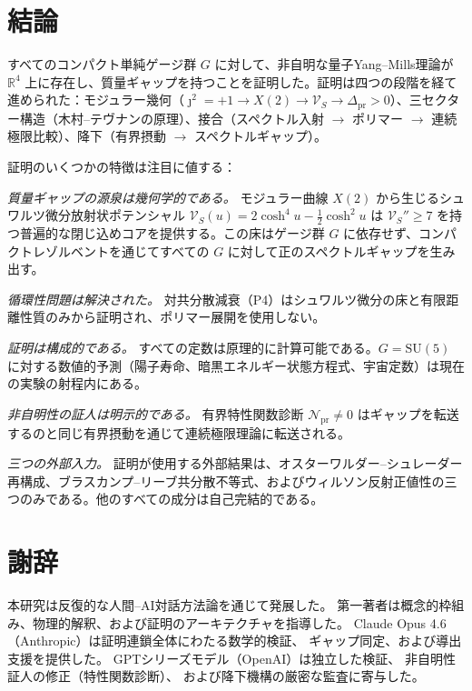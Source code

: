 \documentclass[12pt]{article}
\theoremstyle{plain}
\theoremstyle{definition}
\numberwithin{equation}{section}
\newcommand{\R}{\mathbb{R}}
\newcommand{\pr}{\mathrm{pr}}
\begin{document}
\section*{結論}

すべてのコンパクト単純ゲージ群 $G$ に対して、非自明な量子Yang--Mills理論が $\R^4$ 上に存在し、質量ギャップを持つことを証明した。証明は四つの段階を経て進められた：モジュラー幾何（$\jmath^2=+1\to X(2)\to\mathcal{V}_S\to\Delta_{\pr}>0$）、三セクター構造（木村--テヴナンの原理）、接合（スペクトル入射 $\to$ ポリマー $\to$ 連続極限比較）、降下（有界摂動 $\to$ スペクトルギャップ）。

証明のいくつかの特徴は注目に値する：

\emph{質量ギャップの源泉は幾何学的である。} モジュラー曲線 $X(2)$ から生じるシュワルツ微分放射状ポテンシャル $\mathcal{V}_S(u)=2\cosh^4 u-\frac{1}{2}\cosh^2 u$ は $\mathcal{V}_S''\geq 7$ を持つ普遍的な閉じ込めコアを提供する。この床はゲージ群 $G$ に依存せず、コンパクトレゾルベントを通じてすべての $G$ に対して正のスペクトルギャップを生み出す。

\emph{循環性問題は解決された。} 対共分散減衰（P4）はシュワルツ微分の床と有限距離性質のみから証明され、ポリマー展開を使用しない。

\emph{証明は構成的である。} すべての定数は原理的に計算可能である。$G=\mathrm{SU}(5)$ に対する数値的予測（陽子寿命、暗黒エネルギー状態方程式、宇宙定数）は現在の実験の射程内にある。

\emph{非自明性の証人は明示的である。} 有界特性関数診断 $\mathcal{N}_{\pr}\neq 0$ はギャップを転送するのと同じ有界摂動を通じて連続極限理論に転送される。

\emph{三つの外部入力。} 証明が使用する外部結果は、オスターワルダー--シュレーダー再構成、ブラスカンプ--リーブ共分散不等式、およびウィルソン反射正値性の三つのみである。他のすべての成分は自己完結的である。



\section*{謝辞}

本研究は反復的な人間--AI対話方法論を通じて発展した。
第一著者は概念的枠組み、物理的解釈、および証明のアーキテクチャを指導した。
Claude Opus 4.6（Anthropic）は証明連鎖全体にわたる数学的検証、
ギャップ同定、および導出支援を提供した。
GPTシリーズモデル（OpenAI）は独立した検証、
非自明性証人の修正（特性関数診断）、
および降下機構の厳密な監査に寄与した。
\end{document}
